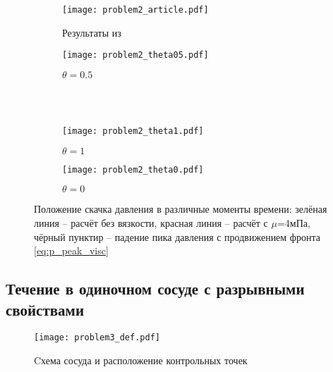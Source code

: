 \begin{figure}[h!]
\begin{subfigure}{0.5\linewidth}\centering
\texttt{[image: problem2\_article.pdf]}
\caption{Результаты из~\cite{boileau:2015}}\label{fig:prob2_a}
\end{subfigure}%
\begin{subfigure}{0.5\linewidth}\centering
\texttt{[image: problem2\_theta05.pdf]}
\caption{$\theta=0.5$}\label{fig:prob2_b}
\end{subfigure} \\
\hfill \\
\begin{subfigure}{0.5\linewidth}\centering
\texttt{[image: problem2\_theta1.pdf]}
\caption{$\theta=1$}\label{fig:prob2_c}
\end{subfigure}%
\begin{subfigure}{0.5\linewidth}\centering
\texttt{[image: problem2\_theta0.pdf]}
\caption{$\theta=0$}\label{fig:prob2_d}
\end{subfigure}%
\caption{Положение скачка давления в различные моменты времени: зелёная линия -- расчёт без вязкости, красная линия -- расчёт с $\mu$=4мПа,
чёрный пунктир -- падение пика давления с продвижением фронта \cref{eq:p_peak_visc}}\label{fig:prob2}
\end{figure}


\clearpage
\subsection{Течение в одиночном сосуде с разрывными свойствами}
\label{sec:problem4}

\begin{figure}[h!]
\centering
\texttt{[image: problem3\_def.pdf]}
\caption{Cхема сосуда и расположение контрольных точек}\label{fig:prob3_def}
\end{figure}


